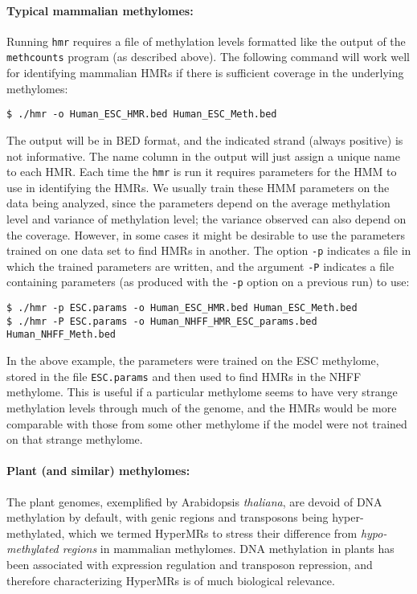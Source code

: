 \documentclass[10pt]{article}
\newcommand{\prog}[1]{\texttt{#1}}
\newcommand{\fn}[1]{\texttt{#1}}
\newcommand{\op}[1]{\texttt{#1}}
\begin{document}
\paragraph{Typical mammalian methylomes:}
Running \prog{hmr} requires a file of methylation levels formatted
like the output of the \prog{methcounts} program (as described
above). The following command will work well for identifying mammalian
HMRs if there is sufficient coverage in the underlying methylomes:
\begin{verbatim}
$ ./hmr -o Human_ESC_HMR.bed Human_ESC_Meth.bed
\end{verbatim}
The output will be in BED format, and the indicated strand (always
positive) is not informative. The name column in the output will just
assign a unique name to each HMR. Each time the \prog{hmr} is run it
requires parameters for the HMM to use in identifying the HMRs. We
usually train these HMM parameters on the data being analyzed, since
the parameters depend on the average methylation level and variance of
methylation level; the variance observed can also depend on the
coverage. However, in some cases it might be desirable to use the
parameters trained on one data set to find HMRs in another. The option
\op{-p} indicates a file in which the trained parameters are written,
and the argument \op{-P} indicates a file containing parameters (as
produced with the \op{-p} option on a previous run) to use:
\begin{verbatim}
$ ./hmr -p ESC.params -o Human_ESC_HMR.bed Human_ESC_Meth.bed
$ ./hmr -P ESC.params -o Human_NHFF_HMR_ESC_params.bed Human_NHFF_Meth.bed
\end{verbatim}
In the above example, the parameters were trained on the ESC
methylome, stored in the file \fn{ESC.params} and then used to find
HMRs in the NHFF methylome. This is useful if a particular methylome
seems to have very strange methylation levels through much of the
genome, and the HMRs would be more comparable with those from some
other methylome if the model were not trained on that strange
methylome.



\paragraph{Plant (and similar) methylomes:} The plant genomes,
exemplified by Arabidopsis \textit{thaliana}, are devoid of DNA
methylation by default, with genic regions and transposons being
hyper-methylated, which we termed HyperMRs to stress their difference
from \textit{hypo-methylated regions} in mammalian methylomes. DNA
methylation in plants has been associated with expression regulation
and transposon repression, and therefore characterizing HyperMRs
is of much biological relevance.
\end{document}
